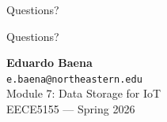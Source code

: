 \documentclass[aspectratio=169,11pt]{beamer}
\begin{document}
\begin{frame}{Questions?}
    \begin{center}
        \Huge Questions?

        \vspace{1cm}
        \normalsize
        \textbf{Eduardo Baena}\\
        \texttt{e.baena@northeastern.edu}\\[0.3cm]
        Module 7: Data Storage for IoT\\
        EECE5155 --- Spring 2026
    \end{center}
\end{frame}
\end{document}
